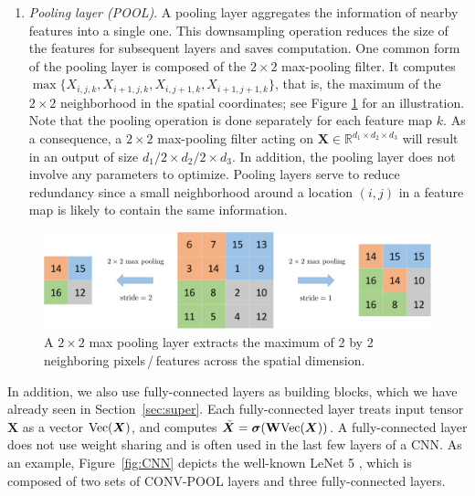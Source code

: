 \begin{enumerate}
\item \emph{Pooling layer (POOL)}. A pooling layer aggregates the information of nearby features into a single one. This downsampling operation reduces the size of the features for subsequent layers and saves computation. One common form of the pooling layer is composed of the $2 \times 2$ max-pooling filter. It computes $\max \{X_{i,j,k}, X_{i+1,j,k}, X_{i,j+1,k}, X_{i+1,j+1,k} \}$, that is, the maximum of the $2 \times 2$ neighborhood in the spatial coordinates; see Figure \ref{fig:pooling} for an illustration. Note that the pooling operation is done separately for each feature map $k$. As a consequence, a $2 \times 2$ max-pooling filter acting on $\bm{X}\in \mathbb{R}^{d_1 \times d_2 \times d_3}$ will result in an output of size $d_1/2 \times d_2/2 \times d_3$. In addition, the pooling layer does not involve any parameters to optimize. Pooling layers serve to reduce redundancy since a small neighborhood around a location $(i,j)$ in a feature map is likely to contain the same information.
\end{enumerate}

\begin{figure}
\centering

\includegraphics[width=0.95 \linewidth]{pooling}\caption{A $2\times 2$ max pooling layer extracts the maximum of 2 by 2 neighboring pixels$\,$/$\,$features across the spatial dimension. }\label{fig:pooling}
\end{figure}

In addition, we also use fully-connected layers as building blocks, which we have already seen in Section~\ref{sec:super}. Each fully-connected layer treats input tensor $\bm{X}$ as a vector $\mathrm{Vec}(\bm{X})$, and computes $\tilde{\bm{X}} = \bm{\sigma}(\mathrm{\bf W} \mathrm{Vec}(\bm{X}))$. A fully-connected layer does not use weight sharing and is often used in the last few layers of a CNN. As an example, Figure~\ref{fig:CNN} depicts the well-known LeNet 5 \citep{lecun1998gradient}, which is composed of two sets of CONV-POOL layers and three fully-connected layers.


